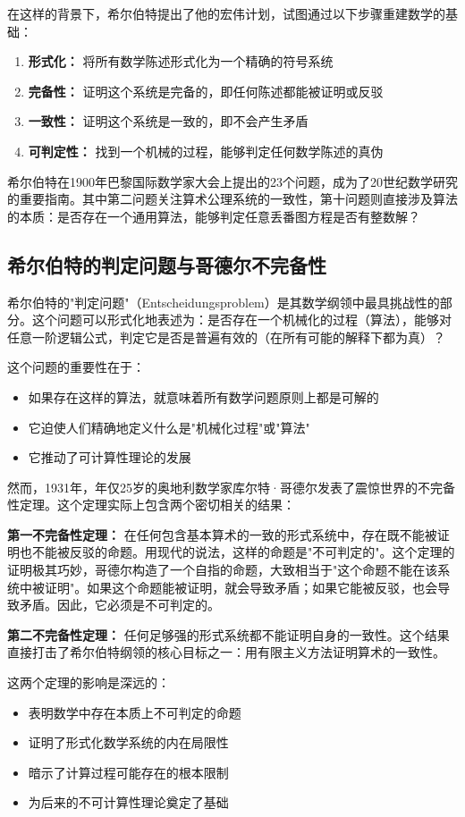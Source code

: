 \documentclass[a4paper,12pt]{ctexart}
\begin{document}
在这样的背景下，希尔伯特提出了他的宏伟计划，试图通过以下步骤重建数学的基础：
\begin{enumerate}
    \item \textbf{形式化：} 将所有数学陈述形式化为一个精确的符号系统
    \item \textbf{完备性：} 证明这个系统是完备的，即任何陈述都能被证明或反驳
    \item \textbf{一致性：} 证明这个系统是一致的，即不会产生矛盾
    \item \textbf{可判定性：} 找到一个机械的过程，能够判定任何数学陈述的真伪
\end{enumerate}

希尔伯特在1900年巴黎国际数学家大会上提出的23个问题，成为了20世纪数学研究的重要指南。其中第二问题关注算术公理系统的一致性，第十问题则直接涉及算法的本质：是否存在一个通用算法，能够判定任意丢番图方程是否有整数解？

\subsection{希尔伯特的判定问题与哥德尔不完备性}
希尔伯特的"判定问题"（Entscheidungsproblem）是其数学纲领中最具挑战性的部分。这个问题可以形式化地表述为：是否存在一个机械化的过程（算法），能够对任意一阶逻辑公式，判定它是否是普遍有效的（在所有可能的解释下都为真）？

这个问题的重要性在于：
\begin{itemize}
    \item 如果存在这样的算法，就意味着所有数学问题原则上都是可解的
    \item 它迫使人们精确地定义什么是"机械化过程"或"算法"
    \item 它推动了可计算性理论的发展
\end{itemize}

然而，1931年，年仅25岁的奥地利数学家库尔特·哥德尔发表了震惊世界的不完备性定理。这个定理实际上包含两个密切相关的结果：

\textbf{第一不完备性定理：}
在任何包含基本算术的一致的形式系统中，存在既不能被证明也不能被反驳的命题。用现代的说法，这样的命题是"不可判定的"。这个定理的证明极其巧妙，哥德尔构造了一个自指的命题，大致相当于"这个命题不能在该系统中被证明"。如果这个命题能被证明，就会导致矛盾；如果它能被反驳，也会导致矛盾。因此，它必须是不可判定的。

\textbf{第二不完备性定理：}
任何足够强的形式系统都不能证明自身的一致性。这个结果直接打击了希尔伯特纲领的核心目标之一：用有限主义方法证明算术的一致性。

这两个定理的影响是深远的：
\begin{itemize}
    \item 表明数学中存在本质上不可判定的命题
    \item 证明了形式化数学系统的内在局限性
    \item 暗示了计算过程可能存在的根本限制
    \item 为后来的不可计算性理论奠定了基础
\end{itemize}
\end{document}
